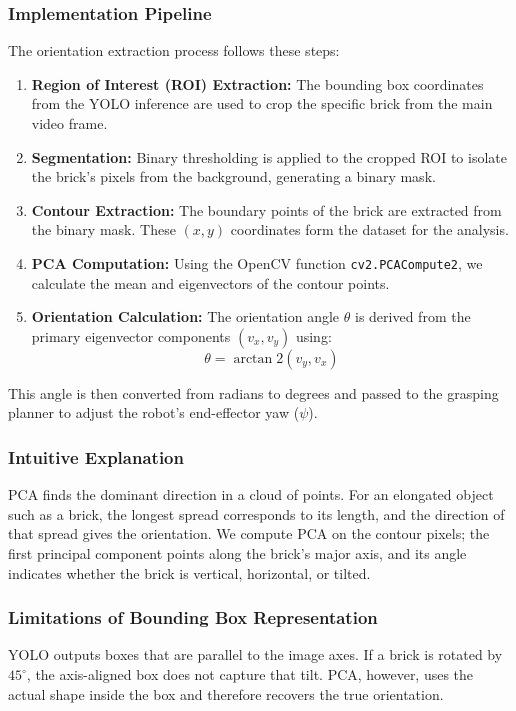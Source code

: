 \subsubsection{Implementation Pipeline}
The orientation extraction process follows these steps:
\begin{enumerate}
    \item \textbf{Region of Interest (ROI) Extraction:} The bounding box coordinates from the YOLO inference are used to crop the specific brick from the main video frame.
    \item \textbf{Segmentation:} Binary thresholding is applied to the cropped ROI to isolate the brick’s pixels from the background, generating a binary mask.
    \item \textbf{Contour Extraction:} The boundary points of the brick are extracted from the binary mask. These $(x, y)$ coordinates form the dataset for the analysis.
    \item \textbf{PCA Computation:} Using the OpenCV function \texttt{cv2.PCACompute2}, we calculate the mean and eigenvectors of the contour points.
    \item \textbf{Orientation Calculation:} The orientation angle $\theta$ is derived from the primary eigenvector components $(v_x, v_y)$ using:
    $$
    \theta = \arctan2(v_y, v_x)
    $$
\end{enumerate}
This angle is then converted from radians to degrees and passed to the grasping planner to adjust the robot's end-effector yaw ($\psi$).

\subsubsection{Intuitive Explanation}
PCA finds the dominant direction in a cloud of points. For an elongated object such as a brick, the longest spread corresponds to its length, and the direction of that spread gives the orientation. We compute PCA on the contour pixels; the first principal component points along the brick's major axis, and its angle indicates whether the brick is vertical, horizontal, or tilted.

\subsubsection{Limitations of Bounding Box Representation}
YOLO outputs boxes that are parallel to the image axes. If a brick is rotated by $45^\circ$, the axis-aligned box does not capture that tilt. PCA, however, uses the actual shape inside the box and therefore recovers the true orientation.

